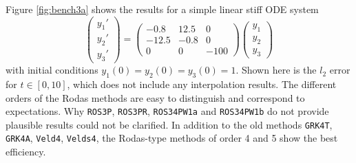 \documentclass{juliacon}
\begin{document}
Figure \ref{fig:bench3a} shows the results for a simple linear stiff ODE system
\begin{equation}
\begin{pmatrix} y_1'\\y_2'\\y_3' \end{pmatrix} =
\begin{pmatrix} -0.8 &12.5& 0\\ -12.5& -0.8& 0\\ 0& 0& -100 \end{pmatrix}
\begin{pmatrix} y_1\\y_2\\y_3 \end{pmatrix}   
\label{eq:stiffode}
\end{equation}
with initial conditions $y_1(0)=y_2(0)=y_3(0)=1$.
Shown here is the $l_2$ error for $t \in [0,10]$, which does not include any interpolation results. The different orders of the Rodas methods are easy to distinguish and correspond to expectations. 
Why \verb|ROS3P|, \verb|ROS3PR|, \verb|ROS34PW1a| and \verb|ROS34PW1b| do not provide plausible results could not be clarified.
In addition to the old methods \verb|GRK4T|, \verb|GRK4A|, \verb|Veld4|, \verb|Velds4|, the Rodas-type methods of order 4 and 5 show the best efficiency.
\end{document}
